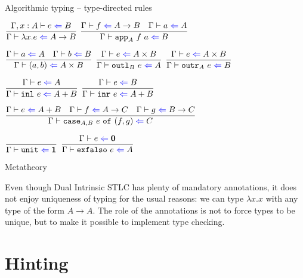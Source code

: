 \documentclass{beamer}
\newcommand{\Fun}[2]{#1 \to #2}
\newcommand{\Prod}[2]{#1 \times #2}
\newcommand{\Sum}[2]{#1 + #2}
\newcommand{\Unit}{\textbf{1}}
\newcommand{\Empty}{\textbf{0}}
\newcommand{\fun}[2]{\lambda #1. #2}
\newcommand{\pair}[2]{(#1, #2)}
\newcommand{\inl}[1]{\texttt{inl}\ #1}
\newcommand{\inr}[1]{\texttt{inr}\ #1}
\newcommand{\unit}{\texttt{unit}}
\newcommand{\exfalso}[1]{\texttt{exfalso}\ #1}
\newcommand{\rulename}[1]{\textsc{\footnotesize{#1}}}
\newcommand{\infrule}[3][]{\displaystyle \frac{#2}{#3} \rulename{#1}}
\newcommand{\extend}[3]{#1, #2 : #3}
\begin{document}
\begin{frame}{Algorithmic typing -- type-directed rules}

\begin{center}
  $\infrule{\fullcheck{\extend{\Gamma}{x}{A}}{e}{B}}{\check{\fun{x}{e}}{\Fun{A}{B}}}$ \enspace
  $\infrule{\check{f}{\Fun{A}{B}} \quad \check{a}{A}}{\check{\iapp{A}{f}{a}}{B}}$

  \vspace{2em}

  $\infrule{\check{a}{A} \quad \check{b}{B}}{\check{\pair{a}{b}}{\Prod{A}{B}}}$ \enspace
  $\infrule{\check{e}{\Prod{A}{B}}}{\check{\ioutl{B}{e}}{A}}$ \enspace
  $\infrule{\check{e}{\Prod{A}{B}}}{\check{\ioutr{A}{e}}{B}}$

  \vspace{2em}

  $\infrule{\check{e}{A}}{\check{\inl{e}}{\Sum{A}{B}}}$ \quad
  $\infrule{\check{e}{B}}{\check{\inr{e}}{\Sum{A}{B}}}$

  \vspace{2em}

  $\infrule{\check{e}{\Sum{A}{B}} \quad \check{f}{\Fun{A}{C}} \quad \check{g}{\Fun{B}{C}}}{\check{\icase{A}{B}{e}{f}{g}}{C}}$

  \vspace{2em}

  $\infrule{}{\check{\unit}{\Unit}}$ \quad
  $\infrule{\check{e}{\Empty}}{\check{\exfalso{e}}{A}}$
\end{center}

\end{frame}

\begin{frame}{Metatheory}

Even though Dual Intrinsic STLC has plenty of mandatory annotations, it does not enjoy uniqueness of typing for the usual reasons: we can type $\fun{x}{x}$ with any type of the form $\Fun{A}{A}$. The role of the annotations is not to force types to be unique, but to make it possible to implement type checking.

\end{frame}

\section{Hinting}

\newcommand{\fullhinting}[4]{#1 \vdash #2 \mathcolor{blue}{\Leftarrow} #3 \mathcolor{red}{\Rightarrow} #4}
\newcommand{\hinting}[3]{\fullhinting{\Gamma}{#1}{#2}{#3}}
\end{document}
